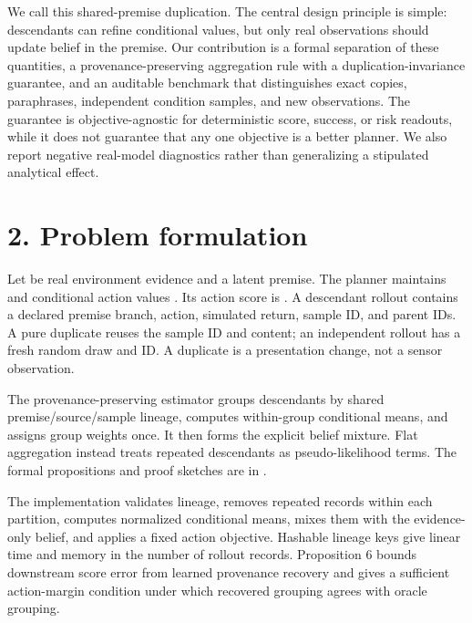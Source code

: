 \documentclass[10pt]{article}
\begin{document}
We call this shared-premise duplication. The central design principle is simple: descendants can refine conditional values, but only real observations should update belief in the premise. Our contribution is a formal separation of these quantities, a provenance-preserving aggregation rule with a duplication-invariance guarantee, and an auditable benchmark that distinguishes exact copies, paraphrases, independent condition samples, and new observations. The guarantee is objective-agnostic for deterministic score, success, or risk readouts, while it does not guarantee that any one objective is a better planner. We also report negative real-model diagnostics rather than generalizing a stipulated analytical effect.

\section{2. Problem formulation}

Let \texttt{} be real environment evidence and \texttt{} a latent premise. The planner maintains \texttt{} and conditional action values \texttt{}. Its action score is \texttt{}. A descendant rollout contains a declared premise branch, action, simulated return, sample ID, and parent IDs. A pure duplicate reuses the sample ID and content; an independent rollout has a fresh random draw and ID. A duplicate is a presentation change, not a sensor observation.

The provenance-preserving estimator groups descendants by shared premise/source/sample lineage, computes within-group conditional means, and assigns group weights once. It then forms the explicit belief mixture. Flat aggregation instead treats repeated descendants as pseudo-likelihood terms. The formal propositions and proof sketches are in \texttt{}.

The implementation validates lineage, removes repeated \texttt{} records within each \texttt{} partition, computes normalized conditional means, mixes them with the evidence-only belief, and applies a fixed action objective. Hashable lineage keys give linear time and memory in the number of rollout records. Proposition 6 bounds downstream score error from learned provenance recovery and gives a sufficient action-margin condition under which recovered grouping agrees with oracle grouping.
\end{document}
